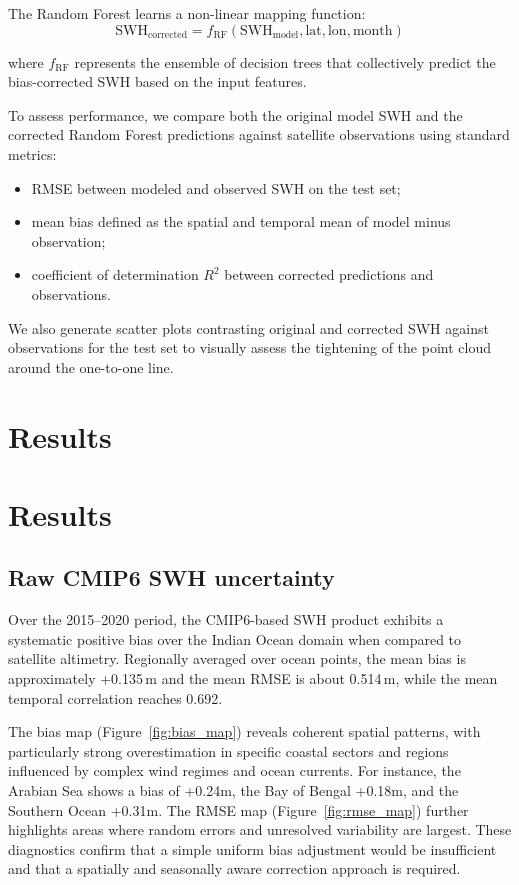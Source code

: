 \documentclass[twocolumn]{article}
\newcommand{\SI}[2]{#1\,#2}
\begin{document}
 The Random Forest learns a non-linear mapping function:
 \begin{equation}
 \text{SWH}_{\text{corrected}} = f_{\text{RF}}(\text{SWH}_{\text{model}}, \text{lat}, \text{lon}, \text{month})
 \end{equation}
 
 where $f_{\text{RF}}$ represents the ensemble of decision trees that collectively predict the bias-corrected SWH based on the input features.
 
 To assess performance, we compare both the original model SWH and the corrected Random Forest predictions against satellite observations using standard metrics:
 \begin{itemize}
   \item RMSE between modeled and observed SWH on the test set;
   \item mean bias defined as the spatial and temporal mean of model minus observation;
   \item coefficient of determination $R^2$ between corrected predictions and observations.
 \end{itemize}
 
 We also generate scatter plots contrasting original and corrected SWH against observations for the test set to visually assess the tightening of the point cloud around the one-to-one line.
 
 \section{Results}
 
\section{Results}
 
 \subsection{Raw CMIP6 SWH uncertainty}
 
 Over the 2015--2020 period, the CMIP6-based SWH product exhibits a systematic positive bias over the Indian Ocean domain when compared to satellite altimetry. Regionally averaged over ocean points, the mean bias is approximately \SI{+0.135}{m} and the mean RMSE is about \SI{0.514}{m}, while the mean temporal correlation reaches 0.692.
 
 The bias map (Figure~\ref{fig:bias_map}) reveals coherent spatial patterns, with particularly strong overestimation in specific coastal sectors and regions influenced by complex wind regimes and ocean currents. For instance, the Arabian Sea shows a bias of +0.24m, the Bay of Bengal +0.18m, and the Southern Ocean +0.31m. The RMSE map (Figure~\ref{fig:rmse_map}) further highlights areas where random errors and unresolved variability are largest. These diagnostics confirm that a simple uniform bias adjustment would be insufficient and that a spatially and seasonally aware correction approach is required.
 
\end{document}
